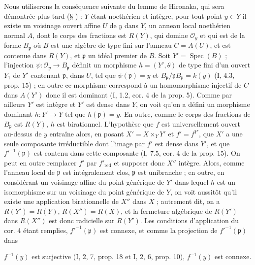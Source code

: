 Nous utiliserons la conséquence suivante du lemme de Hironaka, qui sera démontrée plus tard (§ ) : $Y$ étant noethérien et intègre, pour tout point $y \in Y$ il existe un voisinage ouvert affine $U$ de $y$ dans $Y$, un anneau local noethérien normal $A$, dont le corps des fractions est $R(Y)$, qui domine $\mathcal{O}_y$ et qui est de la forme $B_{\mathfrak{p}}$ où $B$ est une algèbre de type fini sur l'anneau $C=A(U)$, et est contenue dans $R(Y)$, et $\mathfrak{p}$ un idéal premier de $B$. Soit $Y' = \operatorname{Spec}(B)$ ; l'injection $\psi: \mathcal{O}_y \to B_{\mathfrak{p}}$ définit un morphisme $h=(Y', \theta)$ de type fini d'un ouvert $Y_1$ de $Y'$ contenant $\mathfrak{p}$, dans $U$, tel que $\psi(\mathfrak{p})=y$ et $B_{\mathfrak{p}} / \mathfrak{p} B_{\mathfrak{p}} = k(y)$ (I, 4.3, prop. 15) ; en outre ce morphisme correspond à un homomorphisme injectif de $C$ dans $A(Y')$ donc il est dominant (I, 1.2, cor. 4 de la prop. 5). Comme par ailleurs $Y'$ est intègre et $Y'$ est dense dans $Y$, on voit qu'on a défini un morphisme dominant $h: Y' \to Y$ tel que $h(\mathfrak{p})=y$. En outre, comme le corps des fractions de $B_{\mathfrak{p}}$ est $R(Y)$, $h$ est birationnel. L'hypothèse que $f$ est universellement ouvert au-dessus de $y$ entraîne alors, en posant $X'=X \times_Y Y'$ et $f'=f^{Y'}$, que $X'$ a une seule composante irréductible dont l'image par $f'$ est dense dans $Y'$, et que $f'^{-1}(\mathfrak{p})$ est contenu dans cette composante (I, 7.5, cor. 4 de la prop. 15). On peut en outre remplacer $f'$ par $f'_{\operatorname{red}}$ et supposer donc $X''$ intègre. Alors, comme l'anneau local de $\mathfrak{p}$ est intégralement clos, $\mathfrak{p}$ est unibranche ; en outre, en considérant un voisinage affine du point générique de $Y'$ dans lequel $h$ est un isomorphisme sur un voisinage du point générique de $Y$, on voit aussitôt qu'il existe une application birationnelle de $X''$ dans $X$ ; autrement dit, on a $R(Y')=R(Y)$, $R(X'')=R(X)$, et la fermeture algébrique de $R(Y')$ dans $R(X'')$ est donc radicielle sur $R(Y')$. Les conditions d'application du cor. 4 étant remplies, $f'^{-1}(\mathfrak{p})$ est connexe, et comme la projection de $f'^{-1}(\mathfrak{p})$ dans

\newpage


$f^{-1}(y)$ est surjective (I, 2, 7, prop. 18 et I, 2, 6, prop. 10), $f^{-1}(y)$ est connexe.

